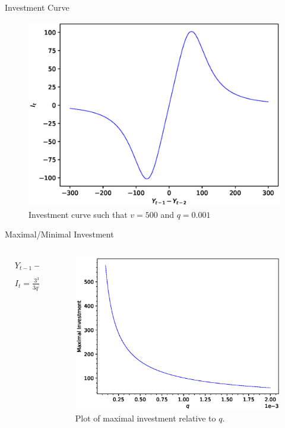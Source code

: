 \documentclass{beamer}
\begin{document}
\begin{frame}{Investment Curve}
	\begin{figure}
		\centering
		\includegraphics[height=0.8\textheight]{investment.eps}
		\caption{Investment curve such that $v=500$ and $q=0.001$}
	\end{figure}
\end{frame}

\begin{frame}{Maximal/Minimal Investment}
	\begin{columns}
	\begin{column}{0.5\textwidth}
		\begin{align*}
			&Y_{t-1}-Y_{t-2} = \pm\frac{q^{1/4}v}{3^{1/4}}\\
			&I_t = \frac{3^{3/4}}{3q^{3/4}}
		\end{align*}
	\end{column}
	\begin{column}{0.5\textwidth}
		\begin{figure}
			\centering
			\includegraphics[width=1.2\textwidth]{maxinvestment.eps}
			\caption{Plot of maximal investment relative to $q$.}
		\end{figure}
	\end{column}
	\end{columns}
\end{frame}
\end{document}
